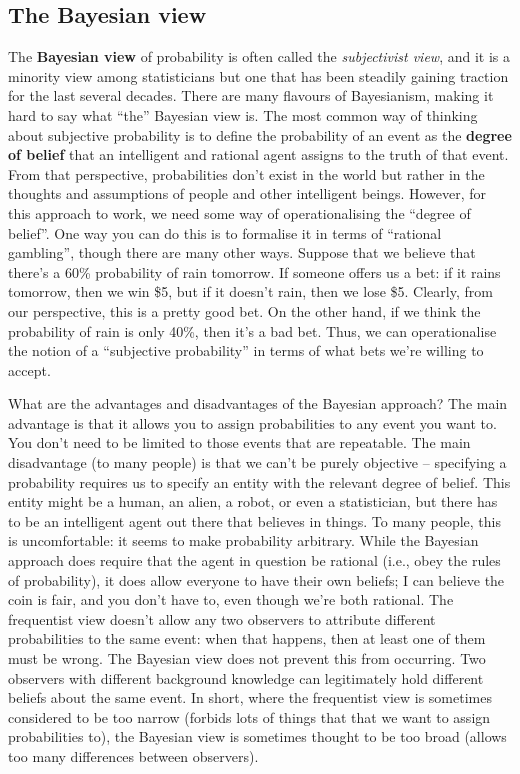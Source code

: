 \documentclass[
  11pt,
  a4paper,
  twoside,symmetric,openright]{book}
\theoremstyle{break}
\theoremstyle{break}
\begin{document}
\subsection{The Bayesian view}\label{the-bayesian-view}

The \textbf{Bayesian view} of probability is often called the \emph{subjectivist view}, and it is a minority view among statisticians but one that has been steadily gaining traction for the last several decades. There are many flavours of Bayesianism, making it hard to say what ``the'' Bayesian view is. The most common way of thinking about subjective probability is to define the probability of an event as the \textbf{degree of belief} that an intelligent and rational agent assigns to the truth of that event. From that perspective, probabilities don't exist in the world but rather in the thoughts and assumptions of people and other intelligent beings.
However, for this approach to work, we need some way of operationalising the ``degree of belief''. One way you can do this is to formalise it in terms of ``rational gambling'', though there are many other ways. Suppose that we believe that there's a 60\% probability of rain tomorrow. If someone offers us a bet: if it rains tomorrow, then we win \$5, but if it doesn't rain, then we lose \$5. Clearly, from our perspective, this is a pretty good bet. On the other hand, if we think the probability of rain is only 40\%, then it's a bad bet. Thus, we can operationalise the notion of a ``subjective probability'' in terms of what bets we're willing to accept.

What are the advantages and disadvantages of the Bayesian approach? The main advantage is that it allows you to assign probabilities to any event you want to. You don't need to be limited to those events that are repeatable. The main disadvantage (to many people) is that we can't be purely objective -- specifying a probability requires us to specify an entity with the relevant degree of belief. This entity might be a human, an alien, a robot, or even a statistician, but there has to be an intelligent agent out there that believes in things. To many people, this is uncomfortable: it seems to make probability arbitrary. While the Bayesian approach does require that the agent in question be rational (i.e., obey the rules of probability), it does allow everyone to have their own beliefs; I can believe the coin is fair, and you don't have to, even though we're both rational. The frequentist view doesn't allow any two observers to attribute different probabilities to the same event: when that happens, then at least one of them must be wrong. The Bayesian view does not prevent this from occurring. Two observers with different background knowledge can legitimately hold different beliefs about the same event. In short, where the frequentist view is sometimes considered to be too narrow (forbids lots of things that that we want to assign probabilities to), the Bayesian view is sometimes thought to be too broad (allows too many differences between observers).
\end{document}
